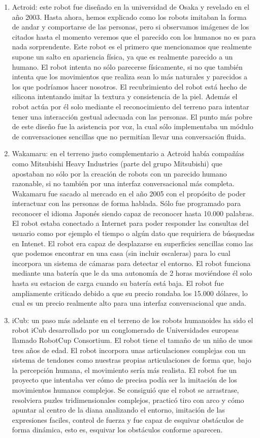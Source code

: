 \begin{enumerate}
  \item Actroid: este robot fue diseñado en la universidad de Osaka y revelado en el año 2003. Hasta ahora, hemos explicado como los robots imitaban la forma de andar y comportarse de las personas, pero si observamos imágenes de los citados hasta el momento veremos que el parecido con los humanos no es para nada sorprendente. Este robot es el primero que mencionamos que realmente supone un salto en apariencia física, ya que es realmente parecido a un humano. El robot intenta no sólo parecerse físicamente, si no que también intenta que los movimientos que realiza sean lo más naturales y parecidos a los que podríamos hacer nosotros. El recubrimiento del robot está hecho de silicona intentando imitar la textura y consistencia de la piel. Además el robot actúa por él solo mediante el reconocimiento del terreno para intentar tener una interacción gestual adecuada con las personas. El punto más pobre de este diseño fue la asistencia por voz, la cual sólo implementaba un módulo de conversaciones sencillas que no permitían llevar una conversación fluida.
  \item Wakamaru: en el terreno justo complementario a Actroid había compañías como Mitsubishi Heavy Industries (parte del grupo Mitsubishi) que apostaban no sólo por la creación de robots con un parecido humano razonable, si no también por una interfaz conversacional más completa. Wakamaru fue sacado al mercado en el año 2005 con el propósito de poder interactuar con las personas de forma hablada. Sólo fue programado para reconocer el idioma Japonés siendo capaz de reconocer hasta 10.000 palabras. El robot estaba conectado a Internet para poder responder las consultas del usuario como por ejemplo el tiempo o algún dato que requiriera de búsquedas en Intenet. El robot era capaz de desplazarse en superficies sencillas como las que podemos encontrar en una casa (sin incluir escaleras) para lo cual incorpora un sistema de cámaras para detectar el entorno. El robot funciona mediante una batería que le da una autonomía de 2 horas moviéndose él solo hasta su estacion de carga cuando su batería está baja. El robot fue ampliamente criticado debido a que su precio rondaba los 15.000 dólares, lo cual es un precio realmente alto para una interfaz conversacional que anda.
  \item iCub: un paso más adelante en el terreno de los robots humanoides ha sido el robot iCub desarrollado por un conglomerado de Universidades europeas llamado RobotCup Consortium. El robot tiene el tamaño de un niño de unos tres años de edad. El robot incorpora unas articulaciones complejas con un sistema de tendones como nuestras propias articulaciones de forma que, bajo la percepción humana, el movimiento sería más realista. El robot fue un proyecto que intentaba ver cómo de precisa podía ser la imitación de los movimientos humanos complejos. Se consiguió que el robot se arrastrase, resolviera puzles tridimensionales complejos, practicó tiro con arco y cómo apuntar al centro de la diana analizando el entorno, imitación de las expresiones faciles, control de fuerza y fue capaz de esquivar obstáculos de forma dinámica, esto es, esquivar los obstáculos conforme aparecen.
\end{enumerate}
